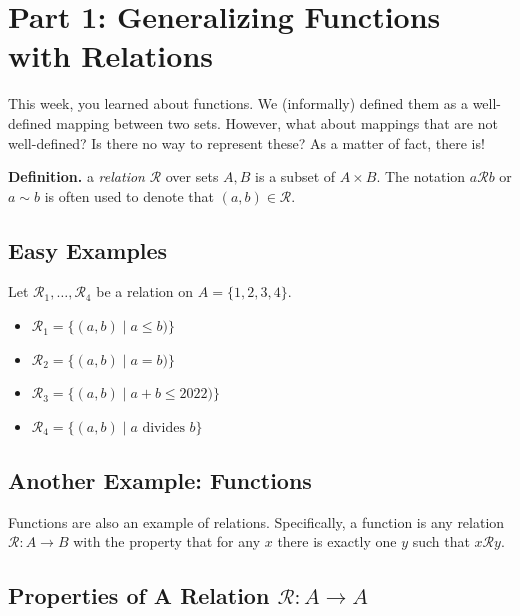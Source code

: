\documentclass{article}
\begin{document}
\section*{Part 1: Generalizing Functions with Relations}

    This week, you learned about functions. We (informally) defined them as a well-defined mapping between two sets. However, what about mappings that are not well-defined? Is there no way to represent these? As a matter of fact, there is!
    
    \vspace{3mm}
    \textbf{Definition.} a \textit{relation} $\mathcal{R}$ over sets $A, B$ is a subset of $A \times B$. The notation $a\mathcal{R}b$ or $a \sim b$ is often used to denote that $(a, b) \in \mathcal{R}$.

    \subsection*{Easy Examples}
    
    Let $\mathcal{R}_1, \dots, \mathcal{R}_4$ be a relation on $A = \{1, 2, 3, 4\}$.
    \begin{itemize}
        \item $\mathcal{R}_1 = \{(a, b) \mid a \le b)\}$
        \item $\mathcal{R}_2 = \{(a, b) \mid a = b)\}$
        \item $\mathcal{R}_3 = \{(a, b) \mid a+b \le 2022)\}$
        \item $\mathcal{R}_4 = \{(a, b) \mid a \text{ divides } b\}$
    \end{itemize}

    \subsection*{Another Example: Functions}
    Functions are also an example of relations. Specifically, a function is any relation $\mathcal{R}: A \rightarrow B$ with the property that for any $x$ there is exactly one $y$ such that $x\mathcal{R}y$.
    
    
\subsection*{Properties of A Relation $\mathcal{R} \colon A \rightarrow A$}
\end{document}
